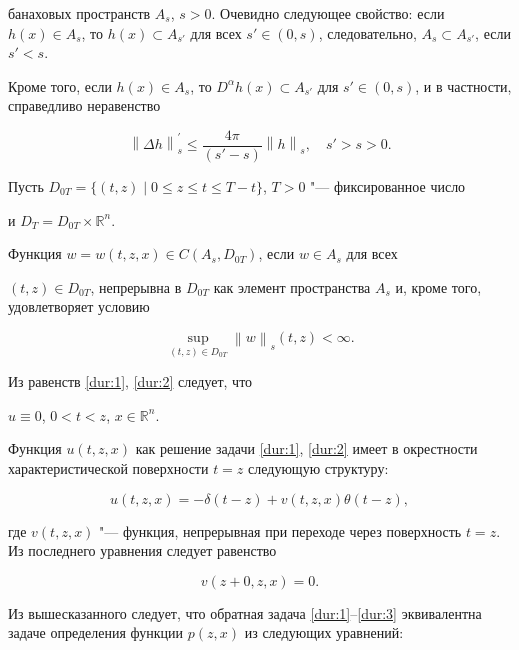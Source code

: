        банаховых пространств ${A_s}$, $s > 0$.  Очевидно следующее   свойство: если $h(x) \in {A_s}$, то $h(x) \subset {A_{s'}}$  для всех $s' \in (0,s)$, следовательно, ${A_s} \subset {A_{s'}}$, если $s' < s$.

       Кроме того, если $h(x) \in {A_s}$, то  ${D^\alpha }h(x) \subset {A_{s'}}$ для  $s' \in (0,s)$, и в частности, справедливо неравенство

\begin{equation}

{\left\| {\Delta h} \right\|_s^{'}} \leqslant \frac{{4\pi }}{{\left( {s' - s} \right)}}{\left\| h \right\|_{s}},

\quad  s' > s > 0. 

\label{dur:4}

\end{equation}



   Пусть ${D_{0T}} = \{ ( t, z) \mid 0 \leqslant z \leqslant t \leqslant T - t \}$,   $T > 0$ "--- фиксированное число

    и ${D_T} = {D_{0T}} \times {\mathbb R^n}$. 



\begin{definition} Функция  $w = w(t,z,x) \in C\left( {{A_s},{D_{0T}}} \right)$, если $w \in {A_s}$ для   всех

      $(t,z) \in {D_{0T}}$, непрерывна в  ${D_{0T}}$  как элемент пространства ${A_s}$ и,  кроме того, удовлетворяет условию

\[\mathop {\sup }\limits_{(t,z) \in {D_{0T}}} {\left\| w \right\|_s}(t,z) < \infty .\]

\end{definition}



Из равенств \eqref{dur:1}, \eqref{dur:2}   следует, что

$u \equiv 0$, $0 < t < z$,    $x \in {\mathbb R^n}$.

Функция $u(t,z,x)$ как  решение задачи  \eqref{dur:1}, \eqref{dur:2} имеет в окрестности  характеристической поверхности $t = z$ следующую структуру:

\[u(t,z,x) =  - \delta (t - z) + v(t,z,x)\theta (t - z),\]

где  $v(t,z,x)$ "--- функция, непрерывная при переходе через поверхность $t = z$.  Из последнего уравнения следует равенство

\[v(z + 0,z,x) = 0.\]

 Из вышесказанного следует, что обратная задача \eqref{dur:1}--\eqref{dur:3} эквивалентна задаче  определения функции $p(z,x)$ из следующих уравнений:

